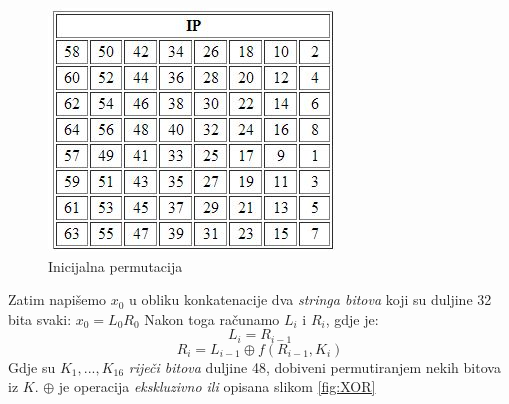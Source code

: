 \documentclass[a4paper,oneside,12pt]{memoir} %
\begin{document}
\begin{spacing}{1.5}
\begin{figure}[h!t]
\centering \includegraphics[scale=1]{IP.jpg}
\caption{Inicijalna permutacija}
\label{fig:IP}
\end{figure}

Zatim napišemo $x_0$ u obliku konkatenacije dva \textit{stringa bitova} koji su duljine 32 bita svaki: $x_0=L_0R_0$ 
Nakon toga računamo $L_i$ i $R_i$, gdje je:
\[L_i=R_{i-1}\]
\[R_i=L_{i-1} \oplus f(R_{i-1}, K_i)\]
Gdje su $K_1,...,K_{16}$ \textit{riječi bitova} duljine 48, dobiveni permutiranjem nekih bitova iz $K$. $\oplus$ je operacija \textit{ekskluzivno ili} opisana slikom \ref{fig:XOR}


\end{spacing}
\end{document}
